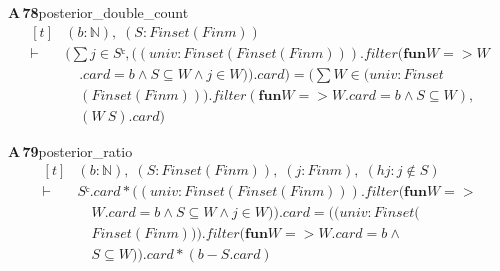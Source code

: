 \documentclass[conference]{IEEEtran}
\theoremstyle{definition}
\newcommand{\lean}[1]{\textsf{\footnotesize #1}}
\begin{document}
\noindent\textbf{A\,78}\quad\lean{posterior\_double\_count}
{\footnotesize\[ \begin{aligned}[t]
&(\mathit{b} : \mathbb{N} ),\; (\mathit{S} : \mathit{Finset} (\mathit{Fin} \mathit{m}))\\
\vdash\;&(\textstyle\sum \mathit{j} \in \mathit{Sᶜ}, ((\mathit{univ} : \mathit{Finset} (\mathit{Finset} (\mathit{Fin} \mathit{m}))).\mathit{filter} (\mathbf{fun} \mathit{W} => \mathit{W}\\
&\quad .\mathit{card} = \mathit{b} \wedge \mathit{S} \subseteq \mathit{W} \wedge \mathit{j} \in \mathit{W})).\mathit{card}) = (\textstyle\sum \mathit{W} \in (\mathit{univ} : \mathit{Finset}\\
&\quad (\mathit{Finset} (\mathit{Fin} \mathit{m}))).\mathit{filter} (\mathbf{fun} \mathit{W} => \mathit{W}.\mathit{card} = \mathit{b} \wedge \mathit{S} \subseteq \mathit{W}),\\
&\quad (\mathit{W} \ \mathit{S}).\mathit{card})
\end{aligned} \]}

\noindent\textbf{A\,79}\quad\lean{posterior\_ratio}
{\footnotesize\[ \begin{aligned}[t]
&(\mathit{b} : \mathbb{N} ),\; (\mathit{S} : \mathit{Finset} (\mathit{Fin} \mathit{m})),\; (\mathit{j} : \mathit{Fin} \mathit{m}),\; (\mathit{hj} : \mathit{j} \notin \mathit{S})\\
\vdash\;&\mathit{Sᶜ}.\mathit{card} * ((\mathit{univ} : \mathit{Finset} (\mathit{Finset} (\mathit{Fin} \mathit{m}))).\mathit{filter} (\mathbf{fun} \mathit{W} =>\\
&\quad \mathit{W}.\mathit{card} = \mathit{b} \wedge \mathit{S} \subseteq \mathit{W} \wedge \mathit{j} \in \mathit{W})).\mathit{card} = ((\mathit{univ} : \mathit{Finset} (\\
&\quad \mathit{Finset} (\mathit{Fin} \mathit{m}))).\mathit{filter} (\mathbf{fun} \mathit{W} => \mathit{W}.\mathit{card} = \mathit{b} \wedge\\
&\quad \mathit{S} \subseteq \mathit{W})).\mathit{card} * (\mathit{b} - \mathit{S}.\mathit{card})
\end{aligned} \]}
\end{document}
